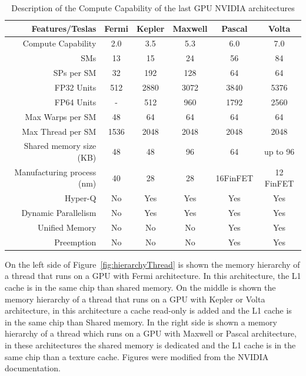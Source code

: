 \begin{table}[htpb]
    \centering
    \begin{tabular}{|r|c|c|c|c|c|}
    \hline\hline
        {\bf Features/Teslas}&{\bf Fermi}&{\bf Kepler}&{\bf Maxwell}&{\bf Pascal}&{\bf Volta}\\\hline
         Compute Capability&2.0&3.5&5.3&6.0&7.0\\\hline
         SMs &13&15&24&56&84\\\hline
         SPs per SM &32&192&128&64&64\\\hline
         FP32 Units&512&2880&3072&3840&5376\\\hline
         FP64 Units &-&512&960&1792&2560\\\hline
         Max Warps per SM&48&64&64&64&64\\\hline
         Max Thread per SM&1536&2048&2048&2048&2048\\\hline
         Shared memory size (KB)&48&48&96&64&up to 96\\\hline
         Manufacturing process (nm)&40&28&28&16FinFET&12 FinFET\\\hline
         Hyper-Q&No&Yes&Yes&Yes&Yes\\\hline
         Dynamic Parallelism&No&Yes&Yes&Yes&Yes\\\hline
         Unified Memory&No&No&No&Yes&Yes\\\hline
         Preemption&No&No&No&Yes&Yes\\\hline\hline
          
    \end{tabular}
    \caption{Description of the Compute Capability of the last GPU NVIDIA architectures}
    \label{tab:CC}
\end{table}

On the left side of Figure~\ref{fig:hierarchyThread} is shown the memory hierarchy of a thread that runs on a GPU with Fermi architecture. In this architecture, the L1 cache is in the same chip than shared memory. On the middle is shown the memory hierarchy of a thread that runs on a GPU with Kepler or Volta architecture, in this architecture a cache read-only is added and the L1 cache is in the same chip than Shared memory. In the right side is shown a memory hierarchy of a thread which runs on a GPU with Maxwell or Pascal architecture, in these architectures the shared memory is dedicated and the L1 cache is in the same chip than a texture cache. Figures were modified from the NVIDIA documentation.

